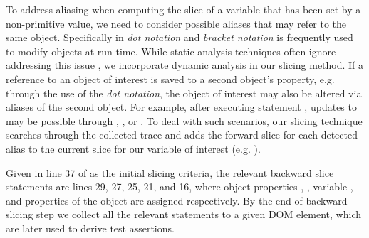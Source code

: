 To address aliasing when computing the slice of a variable that has been set by a non-primitive value, we need to consider possible aliases that may refer to the same object. Specifically in \javascript \textit{dot notation} and \textit{bracket notation} is frequently used to modify objects at run time. While static analysis techniques often ignore addressing this issue \cite{Feldthaus:icse13}, we incorporate dynamic analysis in our slicing method. If a reference to an object of interest is saved to a second object's property, e.g. through the use of the \textit{dot notation}, the object of interest may also be altered via aliases of the second object. For example, after executing statement , updates to  may be possible through , , or . To deal with such scenarios, our slicing technique searches through the collected trace and adds the forward slice for each detected alias to the current slice for our variable of interest (e.g. ). 

Given  in line 37 of  as the initial slicing criteria, the relevant backward slice statements are lines 29, 27, 25, 21, and 16, where object properties , , variable , and properties of the object  are assigned respectively.
By the end of backward slicing step we collect all the relevant statements to a given DOM element, which are later used to derive test assertions.    
